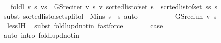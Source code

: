 \begin{isabellebody}
\ \ {\isacharequal}{\kern0pt}\ foldl\ {\isacharparenleft}{\kern0pt}{\isasymlambda}v\ s{\isachardot}{\kern0pt}\ v{\isacharparenleft}{\kern0pt}s\ {\isacharcolon}{\kern0pt}{\isacharequal}{\kern0pt}\ GS{\isacharunderscore}{\kern0pt}rec{\isacharunderscore}{\kern0pt}iter\ v\ s{\isacharparenright}{\kern0pt}{\isacharparenright}{\kern0pt}\ v\ {\isacharparenleft}{\kern0pt}sorted{\isacharunderscore}{\kern0pt}list{\isacharunderscore}{\kern0pt}of{\isacharunderscore}{\kern0pt}set\ {\isacharbraceleft}{\kern0pt}{\isachardot}{\kern0pt}{\isachardot}{\kern0pt}s{\isacharprime}{\kern0pt}{\isacharbraceright}{\kern0pt}\ {\isacharat}{\kern0pt}\ sorted{\isacharunderscore}{\kern0pt}list{\isacharunderscore}{\kern0pt}of{\isacharunderscore}{\kern0pt}set\ {\isacharbraceleft}{\kern0pt}s{\isacharprime}{\kern0pt}{\isacharless}{\kern0pt}{\isachardot}{\kern0pt}{\isachardot}{\kern0pt}{\isacharless}{\kern0pt}s{\isacharbraceright}{\kern0pt}{\isacharparenright}{\kern0pt}\ s{\isacharprime}{\kern0pt}{\isachardoublequoteclose}\isanewline
\ \ \ \ \ \ \isamarkupfalse%
\ {\isacharparenleft}{\kern0pt}subst\ sorted{\isacharunderscore}{\kern0pt}list{\isacharunderscore}{\kern0pt}of{\isacharunderscore}{\kern0pt}set{\isacharunderscore}{\kern0pt}split{\isacharbrackleft}{\kern0pt}of\ {\isacharunderscore}{\kern0pt}\ {\isachardoublequoteopen}Min{\isacharbraceleft}{\kern0pt}s{\isachardot}{\kern0pt}\ s{\isacharprime}{\kern0pt}\ {\isacharless}{\kern0pt}\ s{\isacharbraceright}{\kern0pt}{\isachardoublequoteclose}{\isacharbrackright}{\kern0pt}{\isacharparenright}{\kern0pt}\ auto\isanewline
\ \ \ \ \isamarkupfalse%
\ \isamarkupfalse%
\ {\isachardoublequoteopen}{\isasymdots}\ {\isacharequal}{\kern0pt}\ \ GS{\isacharunderscore}{\kern0pt}rec{\isacharunderscore}{\kern0pt}fun\ v\ s{\isacharprime}{\kern0pt}{\isachardoublequoteclose}\isanewline
\ \ \ \ \ \ \isamarkupfalse%
\ {\isachardoublequoteopen}{}{\isachardoublequoteclose}\ less{\isachardot}{\kern0pt}IH\ \isamarkupfalse%
\ {\isacharparenleft}{\kern0pt}subst\ foldl{\isacharunderscore}{\kern0pt}upd{\isacharunderscore}{\kern0pt}notin{\isacharprime}{\kern0pt}{\isacharparenright}{\kern0pt}\ fastforce{\isacharplus}{\kern0pt}\isanewline
\ \ \ \ \isamarkupfalse%
\ \isamarkupfalse%
\ {\isacharquery}{\kern0pt}case\isacommand{{\isachardot}{\kern0pt}}\isamarkupfalse%
\isanewline
\ \ \isamarkupfalse%
\ {\isacharparenleft}{\kern0pt}auto\ intro{\isacharcolon}{\kern0pt}\ foldl{\isacharunderscore}{\kern0pt}upd{\isacharunderscore}{\kern0pt}notin{\isacharparenright}{\kern0pt}\isanewline

\end{isabellebody}

